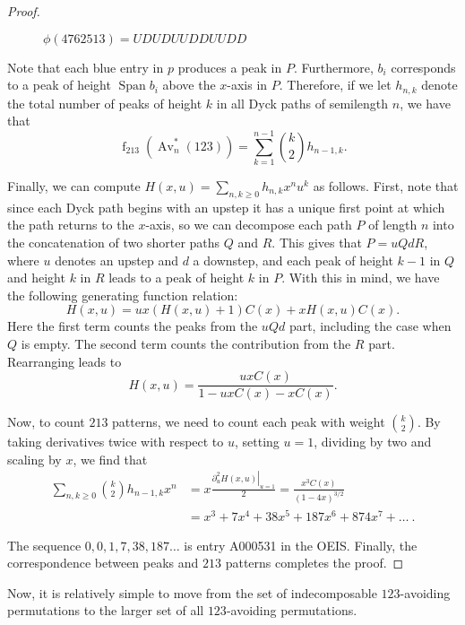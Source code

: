 \documentclass[11pt]{article} %
\theoremstyle{plain}
\theoremstyle{definition}
\newcommand{\Avns}{\Av_n^*(123)}
\DeclareMathOperator{\Av}{Av}
\DeclareMathOperator{\num}{f}
\DeclareMathOperator{\Sp}{Span}
\begin{document}
\begin{proof}
\begin{figure}[ht]
      \caption{$\phi(4762513) = UDUDUUDDUUDD$}
    \end{figure}


    Note that each blue entry in $p$ produces a peak in $P$.
    Furthermore, $b_i$ corresponds to a peak of height $\Sp b_i$
    above the $x$-axis in $P$. Therefore, if we let $h_{n,k}$ denote
    the total number of peaks of height $k$ in all Dyck paths
    of semilength $n$, we have that
    $$ \num_{213}(\Avns) =\sum_{k = 1}^{n-1} \binom{k}{2} h_{n-1,k}.$$

    Finally, we can compute $H(x,u) = \sum_{n,k \geq 0} h_{n,k} x^n
    u^k$ as follows. First, note that since each Dyck path begins with
    an upstep it has a unique first point at which the path returns
    to the $x$-axis, so we can decompose each path $P$ of length $n$
    into the concatenation of two shorter paths $Q$
    and $R$. This gives that $P = uQdR$, where $u$ denotes an upstep and $d$ a
    downstep, and each peak of height $k-1$ in $Q$ and height $k$ in
    $R$ leads to a peak of height $k$ in $P$. With this in mind, we
    have the following generating function relation:
    $$ H(x,u) = ux(H(x,u)+1)C(x) + xH(x,u)C(x) .$$
    Here the first term counts the peaks from the $uQd$ part,
    including the case when $Q$ is empty. The second term counts the
    contribution from the $R$ part.  Rearranging leads to
    $$ H(x,u) = \frac{uxC(x)}{1-uxC(x)-xC(x)}.$$

    Now, to count $213$ patterns, we need to count each peak with
    weight $\binom{k}{2}$. By taking derivatives twice with respect to
    $u$, setting $u=1$, dividing by two and scaling by $x$,
    we find that
    $$ \begin{aligned}
    \sum_{n,k \geq 0} \binom{k}{2} h_{n-1,k}x^n &
    = x \frac{\left. \partial_u ^2 H(x,u)\right|_{u=1}}{2}
    = \frac{x^3C(x)}{(1-4x)^{3/2}} \\
    & = x^3 + 7x^4 + 38x^5 + 187x^6 + 874x^7 + \ldots \ .
    \end{aligned}
    $$

    The sequence $0,0,1,7,38,187\ldots$ is entry A000531 in the OEIS.
    Finally, the correspondence between peaks and  $213$ patterns
    completes the proof.
  \end{proof}

  Now, it is relatively simple to move from the set of indecomposable
  $123$-avoiding permutations to the larger set of all $123$-avoiding
  permutations.
\end{document}
